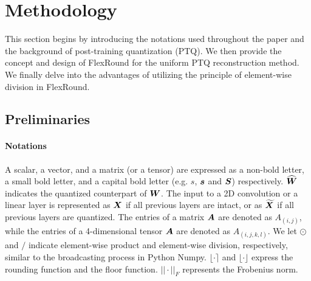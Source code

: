 \documentclass{article}
\theoremstyle{plain}
\theoremstyle{definition}
\theoremstyle{remark}
\begin{document}
\section{Methodology}\label{sec:methodolgy}

This section begins by introducing the notations used throughout the paper and the background of post-training quantization (PTQ). We then provide the concept and design of FlexRound for the uniform PTQ reconstruction method. We finally delve into the advantages of utilizing the principle of element-wise division in FlexRound.

\subsection{Preliminaries}\label{subsec:preliminaries}

\paragraph{Notations} A scalar, a vector, and a matrix (or a tensor) are expressed as a non-bold letter, a small bold letter, and a capital bold letter (e.g. $s$, ${\bm{s}}$ and ${\bm{S}}$) respectively. $\widehat{{\bm{W}}}$ indicates the quantized counterpart of ${\bm{W}}$. 
The input to a 2D convolution or a linear layer is represented as ${\bm{X}}$ if all previous layers are intact, or as $\widetilde{{\bm{X}}}$ if all previous layers are quantized. 
The entries of a matrix ${\bm{A}}$ are denoted as $A_{(i, j)}$, while the entries of a 4-dimensional tensor ${\bm{A}}$ are denoted as $A_{(i, j, k, l)}$. We let $\odot$ and $\mathbin{/}$ indicate element-wise product and element-wise division, respectively, similar to the broadcasting process in Python Numpy. 
$\lfloor \cdot \rceil$ and $\lfloor \cdot \rfloor$ express the rounding function and the floor function. $|| \cdot ||_F$ represents the Frobenius norm.
\end{document}
